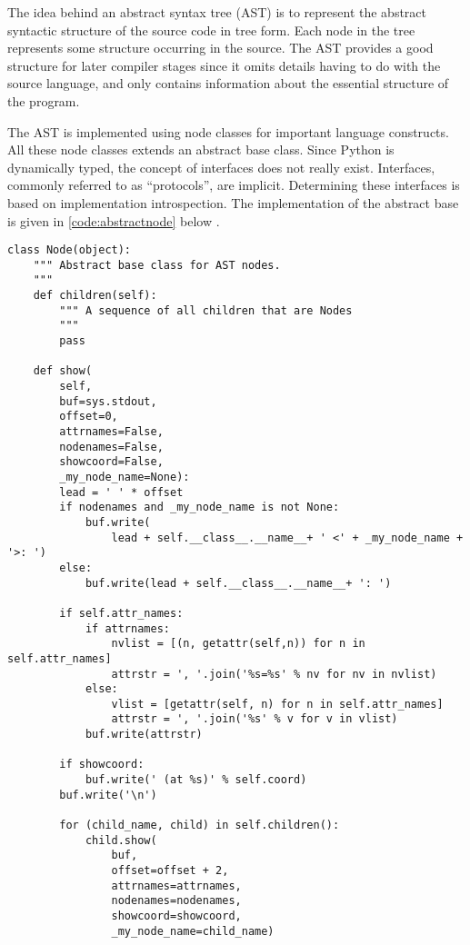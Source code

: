 The idea behind an abstract syntax tree (AST) is to represent the
abstract syntactic structure of the source code in tree form. Each
node in the tree represents some structure occurring in the
source. The AST provides a good structure for later compiler stages
since it omits details having to do with the source language, and only
contains information about the essential structure of the program.

The AST is implemented using node classes for important language
constructs. All these node classes extends an abstract base
class. Since Python is dynamically typed, the concept of interfaces
does not really exist. Interfaces, commonly referred to as
``protocols'', are implicit. Determining these interfaces is based on
implementation introspection. The implementation of the abstract base
is given in \autoref{code:abstractnode} below
\citep{pycparser:online}.

\begin{lstlisting}
class Node(object):
    """ Abstract base class for AST nodes.
    """
    def children(self):
        """ A sequence of all children that are Nodes
        """
        pass

    def show(
        self,
        buf=sys.stdout,
        offset=0,
        attrnames=False,
        nodenames=False,
        showcoord=False,
        _my_node_name=None):
        lead = ' ' * offset
        if nodenames and _my_node_name is not None:
            buf.write(
                lead + self.__class__.__name__+ ' <' + _my_node_name + '>: ')
        else:
            buf.write(lead + self.__class__.__name__+ ': ')

        if self.attr_names:
            if attrnames:
                nvlist = [(n, getattr(self,n)) for n in self.attr_names]
                attrstr = ', '.join('%s=%s' % nv for nv in nvlist)
            else:
                vlist = [getattr(self, n) for n in self.attr_names]
                attrstr = ', '.join('%s' % v for v in vlist)
            buf.write(attrstr)

        if showcoord:
            buf.write(' (at %s)' % self.coord)
        buf.write('\n')

        for (child_name, child) in self.children():
            child.show(
                buf,
                offset=offset + 2,
                attrnames=attrnames,
                nodenames=nodenames,
                showcoord=showcoord,
                _my_node_name=child_name)
\end{lstlisting}

